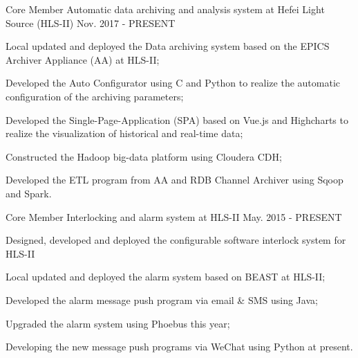 

\begin{cventries}

  \cventry
    {Core Member} %
    {Automatic data archiving and analysis system at Hefei Light Source (HLS-II)} %
    {} %
    {Nov. 2017 - PRESENT} %
    {
      \begin{cvitems} %
        \item {Local updated and deployed the Data archiving system based on the EPICS Archiver Appliance (AA) at HLS-II;}
        \item {Developed the Auto Configurator using C and Python to realize the automatic configuration of the archiving parameters;}
        \item {Developed the Single-Page-Application (SPA) based on Vue.js and Highcharts to realize the visualization of historical and real-time data;}
        \item {Constructed the Hadoop big-data platform using Cloudera CDH;}
        \item {Developed the ETL program from AA and RDB Channel Archiver using Sqoop and Spark.}
      \end{cvitems}
    }

  \cventry
    {Core Member} %
    {Interlocking and alarm system at HLS-II} %
    {} %
    {May. 2015 - PRESENT} %
    {
      \begin{cvitems} %
        \item {Designed, developed and deployed the configurable software interlock system for HLS-II}
        \item {Local updated and deployed the alarm system based on BEAST at HLS-II;}
        \item {Developed the alarm message push program via email \& SMS using Java;}
        \item {Upgraded the alarm system using Phoebus this year;}
        \item {Developing the new message push programs via WeChat using Python at present.}
      \end{cvitems}
    }


\end{cventries}
